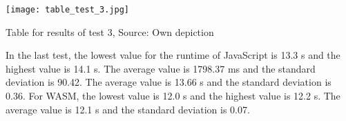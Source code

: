 \begin{table}[H]
    \texttt{[image: table\_test\_3.jpg]}
    \centering
    \caption{Table for results of test 3, Source: Own depiction}
	\label{fig:tableTest3}
\end{table}
In the last test, the lowest value for the runtime of JavaScript is 13.3 s and the highest value is 14.1 s. The average value is 1798.37 ms and the standard deviation is 90.42. The average value is 13.66 s and the standard deviation is 0.36. For WASM, the lowest value is 12.0 s and the highest value is 12.2 s. The average value is 12.1 s and the standard deviation is 0.07.